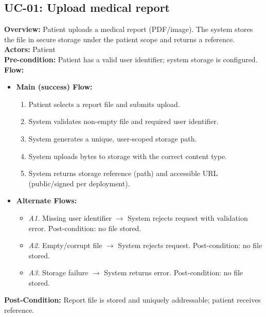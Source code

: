 \documentclass[12pt, a4paper]{article}
\begin{document}
\subsection*{UC-01: Upload medical report}
\textbf{Overview:} Patient uploads a medical report (PDF/image). The system stores the file in secure storage under the patient scope and returns a reference. \\
\textbf{Actors:} Patient \\
\textbf{Pre-condition:} Patient has a valid user identifier; system storage is configured. \\
\textbf{Flow:}
\begin{itemize}[leftmargin=*]
    \item \textbf{Main (success) Flow:}
    \begin{enumerate}
        \item Patient selects a report file and submits upload.
        \item System validates non-empty file and required user identifier.
        \item System generates a unique, user-scoped storage path.
        \item System uploads bytes to storage with the correct content type.
        \item System returns storage reference (path) and accessible URL (public/signed per deployment).
    \end{enumerate}
    \item \textbf{Alternate Flows:}
    \begin{itemize}
        \item \textit{A1.} Missing user identifier $\rightarrow$ System rejects request with validation error. Post-condition: no file stored.
        \item \textit{A2.} Empty/corrupt file $\rightarrow$ System rejects request. Post-condition: no file stored.
        \item \textit{A3.} Storage failure $\rightarrow$ System returns error. Post-condition: no file stored.
    \end{itemize}
\end{itemize}
\textbf{Post-Condition:} Report file is stored and uniquely addressable; patient receives reference.
\end{document}
